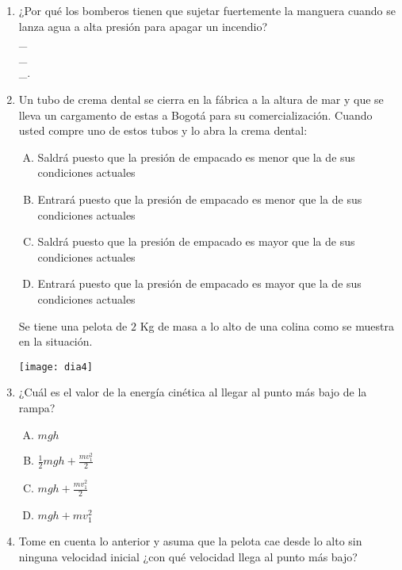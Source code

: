 \begin{enumerate}
\item ¿Por qué los bomberos tienen que sujetar fuertemente la manguera cuando se lanza agua a alta presión para apagar un incendio? \label{dia-13} \hrulefill\\
\_\hrulefill\\
\_\hrulefill\\
\_\hrulefill.


\item Un tubo de crema dental se cierra en la fábrica a la altura de mar y que se lleva un cargamento de estas a Bogotá para su comercialización. Cuando usted compre uno de estos tubos y lo abra la crema dental:\label{dia-14}

\begin{enumerate}[(A)]
\item Saldrá puesto que la presión de empacado es menor que la de sus condiciones actuales
\item Entrará puesto que la presión de empacado es menor que la de sus condiciones actuales
\item Saldrá puesto que la presión de empacado es mayor que la de sus condiciones actuales
\item Entrará puesto que la presión de empacado es mayor que la de sus condiciones actuales
\end{enumerate}

\noindent Se tiene una pelota de $2$ Kg de masa a lo alto de una colina como se muestra en la situación.

\texttt{[image: dia4]}

\item ¿Cuál es el valor de la energía cinética al llegar al punto más bajo de la rampa? \label{dia-15}

\begin{enumerate}[(A)]
\item $mgh$
\item $\frac{1}{2}mgh+\frac{mv_1^2}{2}$
\item $mgh+\frac{mv_1^2}{2}$
\item $mgh+mv_1^2$
\end{enumerate}


\item Tome en cuenta lo anterior y asuma que la pelota cae desde lo alto sin ninguna velocidad inicial ¿con qué velocidad llega al punto más bajo? \label{dia-16}


\end{enumerate}
